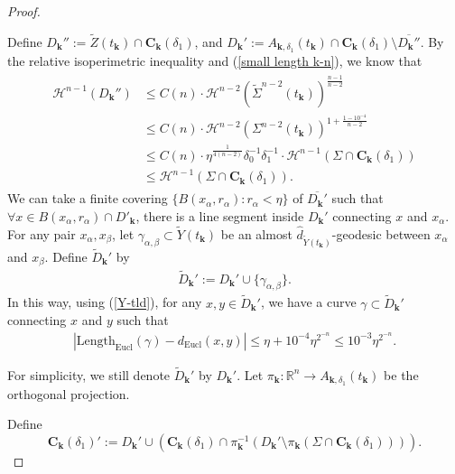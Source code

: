 \documentclass[letter]{amsart}
\theoremstyle{definition}
\theoremstyle{remark}
\begin{document}
\begin{proof}
\begin{itemize}
\end{itemize}
Define $D_{\mathbf{k}}'':= \tilde{Z}(t_{\mathbf{k}}) \cap \mathbf{C}_{\mathbf{k}}(\delta _1)$, and $D_{\mathbf{k}}' := A_{\mathbf{k}, \delta _1}(t_{\mathbf{k}}) \cap \mathbf{C}_{\mathbf{k}}(\delta _1) \setminus \overline{D_{\mathbf{k}}''}$.
By the relative isoperimetric inequality and (\ref{small length k-n}), we know that
\begin{align}\label{aread''-n}
	\begin{split}
		\mathcal{H}^{n-1}(D_{\mathbf{k}}'') &\leq C(n)\cdot  \mathcal{H}^{n-2}(\tilde{\Sigma}^{n-2}(t_{\mathbf{k}}) ) ^{\frac{n-1}{n-2}}\\
					    &\leq C (n)\cdot  \mathcal{H}^{n-2}( \Sigma^{n-2}(t _{\mathbf{k}}) ) ^{ 1+ \frac{1- 10^{-4}}{n-2}}\\
					    &\leq C(n)\cdot \eta^{\frac{1}{4(n-2)}} \delta _0^{-1} \delta _1^{-1} \cdot  \mathcal{H}^{n-1}(\Sigma \cap \mathbf{C}_{\mathbf{k}}(\delta _1) )\\
				&\leq \mathcal{H}^{n-1}(\Sigma \cap \mathbf{C}_{\mathbf{k}}(\delta _1)).
\end{split}
\end{align}
We can take a finite covering $\{ B(x_\alpha , r_\alpha ): r_\alpha < \eta\} $ of $\overline{D_{\mathbf{k}}'}$ such that $\forall x \in B(x_\alpha , r_\alpha ) \cap D'_{\mathbf{k}}$, there is a line segment inside $D_{\mathbf{k}}'$ connecting $ x$ and $x_\alpha $. For any pair $x_\alpha , x_\beta $, let $\gamma _{\alpha , \beta } \subset \tilde{Y}(t_\mathbf{k}	) $ be an almost $\hat{d}_{\tilde{Y}(t_{\mathbf{k}})}$-geodesic between $x_\alpha$ and $x_\beta $.  Define $\tilde{D}_{\mathbf{k}}'$ by 
\begin{align*}
	\tilde{D}_{\mathbf{k}}' := D_{\mathbf{k}}' \cup \{\gamma _{\alpha , \beta }\} .
\end{align*}
In this way, using (\ref{Y-tld}), for any $x, y \in \tilde{D}_{\mathbf{k}}'$, we have a curve $\gamma \subset \tilde{D}_{\mathbf{k}}'$ connecting $x$ and $y$ such that
\begin{align}\label{dist-ind-n}
|\mathrm{Length}_{\mathrm{Eucl}}(\gamma ) - d_{\mathrm{Eucl}}(x,y)| \leq \eta + 10^{-4} \eta ^{2^{-n}} \leq 10^{-3}\eta ^{2^{-n}} .
\end{align}

For simplicity, we still denote $\tilde{D}_{\mathbf{k}}'$ by $D_{\mathbf{k}}'$.
 Let $\pi_{\mathbf{k}} : \mathbb{R}^n\to A_{\mathbf{k}, \delta _1}(t_{\mathbf{k}})$ be the orthogonal projection.

 Define 
 $$\mathbf{C}_{\mathbf{k}}(\delta _1)':= D_{\mathbf{k}}' \cup \left( \mathbf{C}_{\mathbf{k}}(\delta _1) \cap \pi_{\mathbf{k}}^{-1} (D_{\mathbf{k}}' \setminus \pi_\mathbf{k}(\Sigma \cap \mathbf{C}_\mathbf{k}(\delta _1) ) ) \right) .$$



\end{proof}
\end{document}
